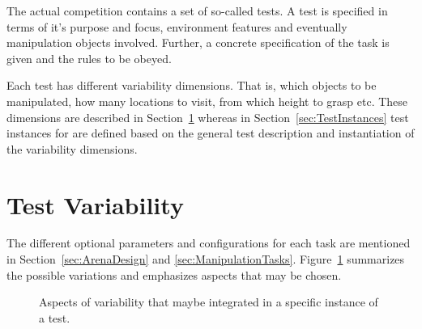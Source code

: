 
The actual competition contains a set of so-called tests. 
A test is specified in terms of it's purpose and focus, environment features and eventually manipulation objects involved. Further, a concrete specification of the task is given and the rules to be obeyed. 

Each test has different variability dimensions. That is, which objects to be manipulated, how many locations to visit, from which height to grasp etc. These dimensions are described in Section~\ref{sec:TestVariability} whereas in Section~\ref{sec:TestInstances} test instances for \YEAR are defined based on the general test description and instantiation of the variability dimensions. 












\newpage
\section{Test Variability} \label{sec:TestVariability}


The different optional parameters and configurations for each task are 
mentioned in Section~\ref{sec:ArenaDesign} and \ref{sec:ManipulationTasks}. 
Figure~\ref{fig:complexityTree} summarizes the possible variations and 
emphasizes aspects that may be chosen.

\begin{figure}[ht]
\centering

\caption{Aspects of variability that maybe integrated in a specific instance of a test.}
\label{fig:complexityTree}
\end{figure}



